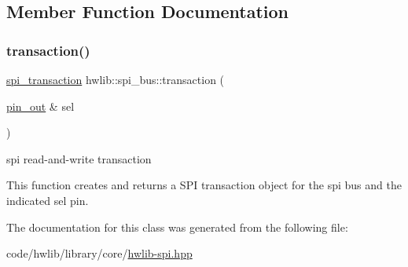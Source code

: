 \subsection{Member Function Documentation}
\mbox{\label{classhwlib_1_1spi__bus_ad28cd2173d2401a5a4437ff1d76175b5}} 
\subsubsection{\texorpdfstring{transaction()}{transaction()}}
{\footnotesize\ttfamily \hyperlink{classhwlib_1_1spi__bus_1_1spi__transaction}{spi\+\_\+transaction} hwlib\+::spi\+\_\+bus\+::transaction (\begin{DoxyParamCaption}\item[{\hyperlink{classhwlib_1_1pin__out}{pin\+\_\+out} \&}]{sel }\end{DoxyParamCaption})\hspace{0.3cm}{\ttfamily [inline]}}

spi read-\/and-\/write transaction

This function creates and returns a S\+PI transaction object for the spi bus and the indicated sel pin. 

The documentation for this class was generated from the following file\+:\begin{DoxyCompactItemize}
\item 
code/hwlib/library/core/\hyperlink{hwlib-spi_8hpp}{hwlib-\/spi.\+hpp}\end{DoxyCompactItemize}
